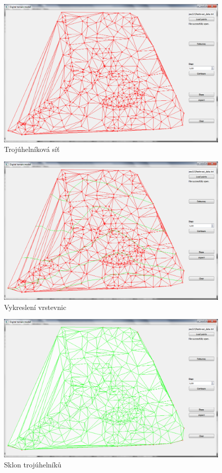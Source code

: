 \documentclass[a4paper, 12pt]{article}
\begin{document}
\begin{figure}[h!]
	\centering
	\includegraphics[width=15cm]{./pictures/app_delaunay.png}
	\caption{Trojúhelníková síť}
\end{figure}

\begin{figure}[h!]
	\centering
	\includegraphics[width=15cm]{./pictures/app_contours.png}
	\caption{Vykreslení vrstevnic}
\end{figure}

\begin{figure}[h!]
	\centering
	\includegraphics[width=15cm]{./pictures/app_slope.png}
	\caption{Sklon trojúhelníků}
\end{figure}
\end{document}
